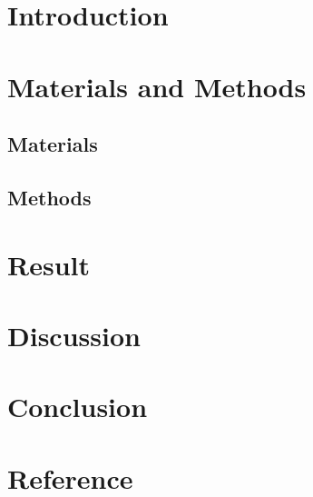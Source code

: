 \section{Introduction}

\section{Materials and Methods}
\subsection{Materials}



\subsection{Methods}

\section{Result}

\section{Discussion}

\section{Conclusion}

\section{Reference}